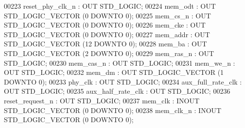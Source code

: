 \begin{DoxyCode}
00223         reset_phy_clk_n : \textcolor{keywordflow}{OUT} \textcolor{comment}{STD\_LOGIC};
00224         mem_odt             : \textcolor{keywordflow}{OUT} \textcolor{comment}{STD\_LOGIC\_VECTOR} (\textcolor{vhdllogic}{}\textcolor{vhdllogic}{0} \textcolor{keywordflow}{DOWNTO} \textcolor{vhdllogic}{}\textcolor{vhdllogic}{0});
00225         mem_cs_n                : \textcolor{keywordflow}{OUT} \textcolor{comment}{STD\_LOGIC\_VECTOR} (\textcolor{vhdllogic}{}\textcolor{vhdllogic}{0} \textcolor{keywordflow}{DOWNTO} \textcolor{vhdllogic}{}\textcolor{vhdllogic}{0});
00226         mem_cke             : \textcolor{keywordflow}{OUT} \textcolor{comment}{STD\_LOGIC\_VECTOR} (\textcolor{vhdllogic}{}\textcolor{vhdllogic}{0} \textcolor{keywordflow}{DOWNTO} \textcolor{vhdllogic}{}\textcolor{vhdllogic}{0});
00227         mem_addr                : \textcolor{keywordflow}{OUT} \textcolor{comment}{STD\_LOGIC\_VECTOR} (\textcolor{vhdllogic}{}\textcolor{vhdllogic}{12} \textcolor{keywordflow}{DOWNTO} \textcolor{vhdllogic}{}\textcolor{vhdllogic}{0});
00228         mem_ba              : \textcolor{keywordflow}{OUT} \textcolor{comment}{STD\_LOGIC\_VECTOR} (\textcolor{vhdllogic}{}\textcolor{vhdllogic}{2} \textcolor{keywordflow}{DOWNTO} \textcolor{vhdllogic}{}\textcolor{vhdllogic}{0});
00229         mem_ras_n           : \textcolor{keywordflow}{OUT} \textcolor{comment}{STD\_LOGIC};
00230         mem_cas_n           : \textcolor{keywordflow}{OUT} \textcolor{comment}{STD\_LOGIC};
00231         mem_we_n                : \textcolor{keywordflow}{OUT} \textcolor{comment}{STD\_LOGIC};
00232         mem_dm              : \textcolor{keywordflow}{OUT} \textcolor{comment}{STD\_LOGIC\_VECTOR} (\textcolor{vhdllogic}{}\textcolor{vhdllogic}{1} \textcolor{keywordflow}{DOWNTO} \textcolor{vhdllogic}{}\textcolor{vhdllogic}{0});
00233         phy_clk             : \textcolor{keywordflow}{OUT} \textcolor{comment}{STD\_LOGIC};
00234         aux_full_rate_clk   : \textcolor{keywordflow}{OUT} \textcolor{comment}{STD\_LOGIC};
00235         aux_half_rate_clk   : \textcolor{keywordflow}{OUT} \textcolor{comment}{STD\_LOGIC};
00236         reset_request_n : \textcolor{keywordflow}{OUT} \textcolor{comment}{STD\_LOGIC};
00237         mem_clk             : \textcolor{keywordflow}{INOUT} \textcolor{comment}{STD\_LOGIC\_VECTOR} (\textcolor{vhdllogic}{}\textcolor{vhdllogic}{0} \textcolor{keywordflow}{DOWNTO} \textcolor{vhdllogic}{}\textcolor{vhdllogic}{0});
00238         mem_clk_n           : \textcolor{keywordflow}{INOUT} \textcolor{comment}{STD\_LOGIC\_VECTOR} (\textcolor{vhdllogic}{}\textcolor{vhdllogic}{0} \textcolor{keywordflow}{DOWNTO} \textcolor{vhdllogic}{}\textcolor{vhdllogic}{0});

\end{DoxyCode}
